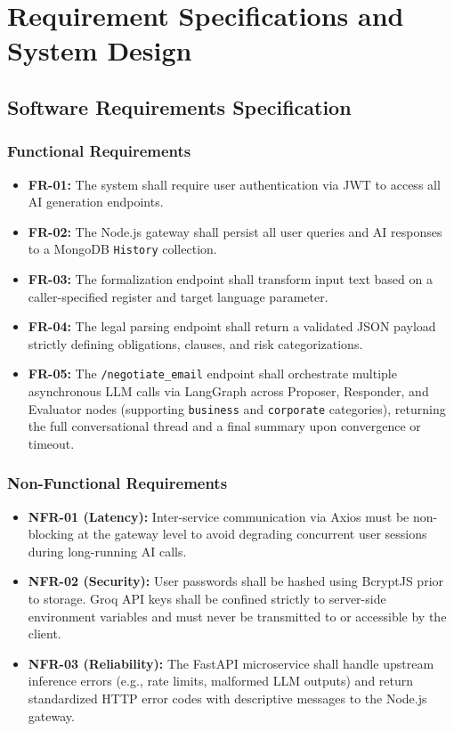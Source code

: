 \documentclass[12pt,a4paper]{report}
\begin{document}
\chapter{Requirement Specifications and System Design}

\section{Software Requirements Specification}

\subsection{Functional Requirements}
\begin{itemize}
	\item \textbf{FR-01:} The system shall require user authentication via JWT to access all AI generation endpoints.
	\item \textbf{FR-02:} The Node.js gateway shall persist all user queries and AI responses to a MongoDB \texttt{History} collection.
	\item \textbf{FR-03:} The formalization endpoint shall transform input text based on a caller-specified register and target language parameter.
	\item \textbf{FR-04:} The legal parsing endpoint shall return a validated JSON payload strictly defining obligations, clauses, and risk categorizations.
	\item \textbf{FR-05:} The \texttt{/negotiate\_email} endpoint shall orchestrate multiple asynchronous LLM calls via LangGraph across Proposer, Responder, and Evaluator nodes (supporting \texttt{business} and \texttt{corporate} categories), returning the full conversational thread and a final summary upon convergence or timeout.
\end{itemize}

\subsection{Non-Functional Requirements}
\begin{itemize}
	\item \textbf{NFR-01 (Latency):} Inter-service communication via Axios must be non-blocking at the gateway level to avoid degrading concurrent user sessions during long-running AI calls.
	\item \textbf{NFR-02 (Security):} User passwords shall be hashed using BcryptJS prior to storage. Groq API keys shall be confined strictly to server-side environment variables and must never be transmitted to or accessible by the client.
	\item \textbf{NFR-03 (Reliability):} The FastAPI microservice shall handle upstream inference errors (e.g., rate limits, malformed LLM outputs) and return standardized HTTP error codes with descriptive messages to the Node.js gateway.
\end{itemize}
\end{document}
